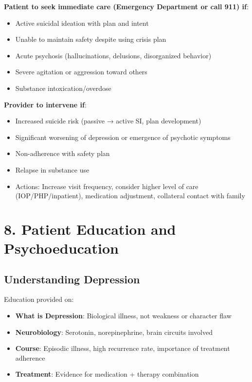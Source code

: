 \documentclass[11pt,letterpaper]{article}
\begin{document}
\textbf{Patient to seek immediate care (Emergency Department or call 911) if}:
\begin{itemize}[leftmargin=*]
    \item Active suicidal ideation with plan and intent
    \item Unable to maintain safety despite using crisis plan
    \item Acute psychosis (hallucinations, delusions, disorganized behavior)
    \item Severe agitation or aggression toward others
    \item Substance intoxication/overdose
\end{itemize}

\textbf{Provider to intervene if}:
\begin{itemize}[leftmargin=*]
    \item Increased suicide risk (passive → active SI, plan development)
    \item Significant worsening of depression or emergence of psychotic symptoms
    \item Non-adherence with safety plan
    \item Relapse in substance use
    \item Actions: Increase visit frequency, consider higher level of care (IOP/PHP/inpatient), medication adjustment, collateral contact with family
\end{itemize}

\section*{8. Patient Education and Psychoeducation}

\subsection*{Understanding Depression}

Education provided on:
\begin{itemize}[leftmargin=*]
    \item \textbf{What is Depression}: Biological illness, not weakness or character flaw
    \item \textbf{Neurobiology}: Serotonin, norepinephrine, brain circuits involved
    \item \textbf{Course}: Episodic illness, high recurrence rate, importance of treatment adherence
    \item \textbf{Treatment}: Evidence for medication + therapy combination
\end{itemize}
\end{document}
